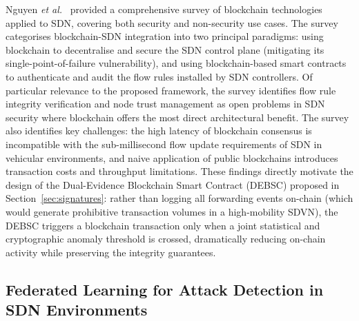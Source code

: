 \documentclass[12pt, a4paper]{report}
\begin{document}
Nguyen \textit{et al.}~\cite{nguyen2021blockchain} provided a comprehensive
survey of blockchain technologies applied to SDN, covering both security
and non-security use cases. The survey categorises blockchain-SDN integration
into two principal paradigms: using blockchain to decentralise and secure
the SDN control plane (mitigating its single-point-of-failure vulnerability),
and using blockchain-based smart contracts to authenticate and audit the
flow rules installed by SDN controllers. Of particular relevance to the
proposed framework, the survey identifies flow rule integrity verification
and node trust management as open problems in SDN security where blockchain
offers the most direct architectural benefit. The survey also identifies
key challenges: the high latency of blockchain consensus is incompatible
with the sub-millisecond flow update requirements of SDN in vehicular
environments, and naive application of public blockchains introduces
transaction costs and throughput limitations. These findings directly
motivate the design of the Dual-Evidence Blockchain Smart Contract (DEBSC)
proposed in Section~\ref{sec:signatures}: rather than logging all forwarding
events on-chain (which would generate prohibitive transaction volumes in
a high-mobility SDVN), the DEBSC triggers a blockchain transaction only
when a joint statistical and cryptographic anomaly threshold is crossed,
dramatically reducing on-chain activity while preserving the integrity
guarantees.

\subsection{Federated Learning for Attack Detection in SDN Environments}
\label{sec:lit_fl_sdn}
\end{document}
